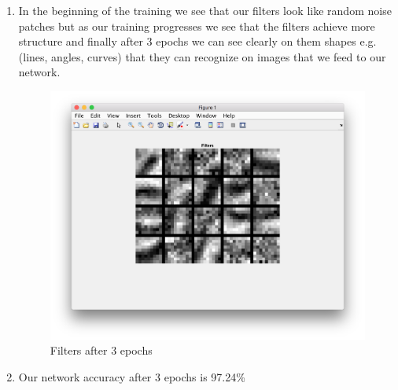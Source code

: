 \documentclass{article}
\begin{document}
\begin{enumerate}
\item In the beginning of the training we see that our filters look like random noise patches but as our training progresses we see that the filters achieve more structure and finally after 3 epochs we can see clearly on them shapes e.g.(lines, angles, curves) that they can recognize on images that we feed to our network.
\begin{figure}[!h]
    \centering
    \includegraphics[width=1\textwidth]{filters.png}
    \caption{Filters after 3 epochs}
    \label{fig:picture}
  \end{figure}
\item Our network accuracy after 3 epochs is 97.24\%
\end{enumerate}
\end{document}
